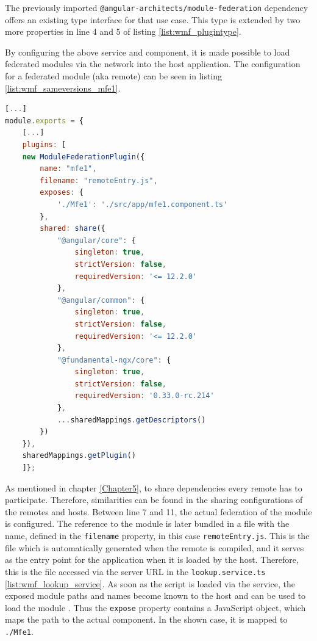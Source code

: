 The previously imported \texttt{@angular-architects/module-federation} dependency offers an existing type interface for that use case. 
This type is extended by two more properties in line 4 and 5 of listing \ref{list:wmf_plugintype}.

By configuring the above service and component, it is made possible to load federated modules via the network into the host application.
The configuration for a federated module (aka remote) can be seen in listing \ref{list:wmf_sameversions_mfe1}.

\newpage

\begin{lstlisting}[language=JavaScript, caption=Content of \texttt{webpack.config.js} of the mfe1 remote app of the same versions WMF project, label=list:wmf_sameversions_mfe1,  xleftmargin=.0\textwidth, xrightmargin=.0\textwidth]
[...]
module.exports = {
	[...]
	plugins: [
	new ModuleFederationPlugin({
		name: "mfe1",
		filename: "remoteEntry.js",
		exposes: {
			'./Mfe1': './src/app/mfe1.component.ts'
		},
		shared: share({
			"@angular/core": { 
				singleton: true, 
				strictVersion: false, 
				requiredVersion: '<= 12.2.0' 
			},
			"@angular/common": { 
				singleton: true, 
				strictVersion: false, 
				requiredVersion: '<= 12.2.0' 
			},
			"@fundamental-ngx/core": { 
				singleton: true, 
				strictVersion: false,
				requiredVersion: '0.33.0-rc.214' 
			},
			...sharedMappings.getDescriptors()
		})
	}),
	sharedMappings.getPlugin()
	]};
\end{lstlisting}

As mentioned in chapter \ref{Chapter5}, to share dependencies every remote has to participate. 
Therefore, similarities can be found in the sharing configurations of the remotes and hosts. 
Between line 7 and 11, the actual federation of the module is configured. 
The reference to the module is later bundled in a file with the name, defined in the \texttt{filename} property, in this case \texttt{remoteEntry.js}.
This is the file which is automatically generated when the remote is compiled, and it serves as the entry point for the application when it is loaded by the host. 
Therefore, this is the file accessed via the server URL in the \texttt{lookup.service.ts} \ref{list:wmf_lookup_service}.
As soon as the script is loaded via the service, the exposed module paths and names become known to the host and can be used to load the module \cite{wmf_concepts}. 
Thus the \texttt{expose} property contains a JavaScript object, which maps the path to the actual component. 
In the shown case, it is mapped to \texttt{./Mfe1}.

